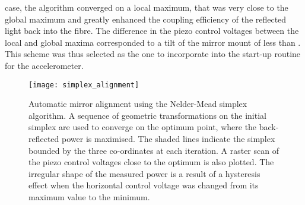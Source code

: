 case, the algorithm converged on a local maximum, that was very close
to the global maximum and greatly enhanced
the coupling efficiency of the reflected light back into the fibre. The
difference in the piezo control voltages between the local and global
maxima corresponded 
to a tilt of the mirror mount of less
than . This scheme was thus selected as the
one to incorporate into the start-up routine for the accelerometer.
\begin{figure}[!htbp] 
  \centering
	\texttt{[image: simplex\_alignment]}
	\caption[Automatic mirror alignment using the Nelder-Mead simplex
		algorithm.]{Automatic mirror alignment using the Nelder-Mead simplex
		algorithm. A sequence of geometric transformations on the initial
    simplex are used to converge on the optimum point, where the
    back-reflected power is maximised. The shaded lines indicate the simplex bounded by
    the three co-ordinates at each iteration.
		A raster scan of the piezo control
		voltages close to the optimum is also plotted. The irregular shape of the
		measured power is a result of a hysteresis effect when the horizontal
		control voltage was changed from its maximum value to the minimum.}
		\label{fig:simplex_optimisation} 
  \end{figure}
